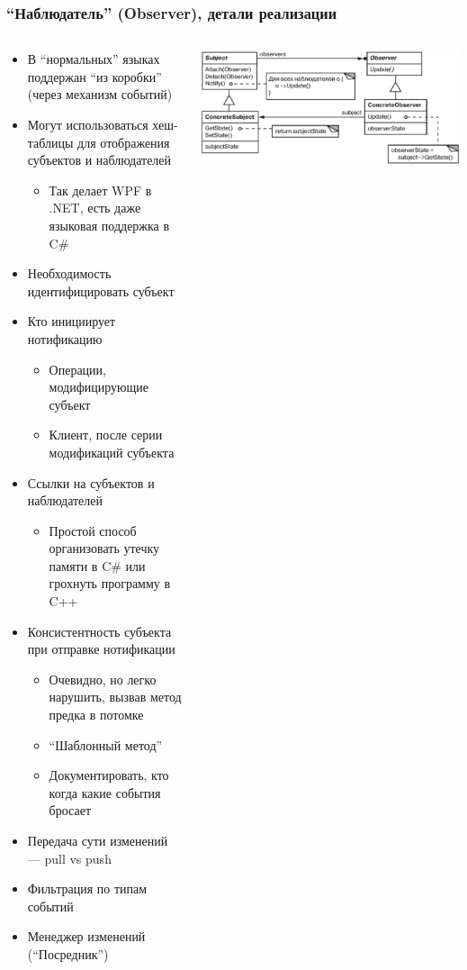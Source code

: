 \documentclass[xetex,mathserif,serif]{beamer}
\begin{document}
	\begin{frame}
		\frametitle{``Наблюдатель'' (Observer), детали реализации}
		\begin{columns}
			\begin{column}{0.5\textwidth}
				\begin{itemize}
					\item В ``нормальных'' языках поддержан ``из коробки'' (через механизм событий)
					\item Могут использоваться хеш-таблицы для отображения субъектов и наблюдателей
					\begin{itemize}
						\item Так делает WPF в .NET, есть даже языковая поддержка в C\#
					\end{itemize}
					\item Необходимость идентифицировать субъект
					\item Кто инициирует нотификацию
					\begin{itemize}
						\item Операции, модифицирующие субъект
						\item Клиент, после серии модификаций субъекта
					\end{itemize}
					\item Ссылки на субъектов и наблюдателей
					\begin{itemize}
						\item Простой способ организовать утечку памяти в C\# или грохнуть программу в C++
					\end{itemize}
					\item Консистентность субъекта при отправке нотификации
					\begin{itemize}
						\item Очевидно, но легко нарушить, вызвав метод предка в потомке
						\item ``Шаблонный метод''
						\item Документировать, кто когда какие события бросает
					\end{itemize}
					\item Передача сути изменений --- pull vs push
					\item Фильтрация по типам событий
					\item Менеджер изменений (``Посредник'')
				\end{itemize}
			\end{column}
			\begin{column}{0.5\textwidth}
				\begin{center}
					\includegraphics[width=\textwidth]{observer.png}

\end{center}
\end{column}
\end{columns}
\end{frame}
\end{document}
